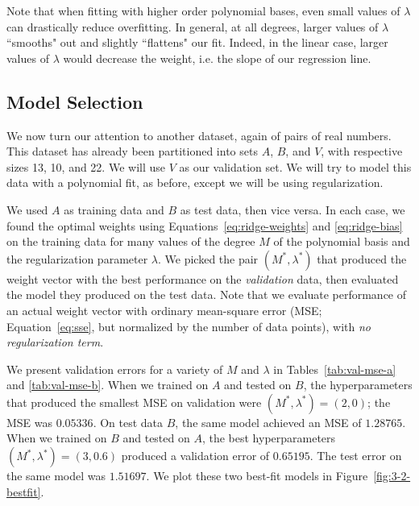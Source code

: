 \documentclass{article}
\begin{document}
\begin{multicols}{2}
Note that when fitting with higher order polynomial bases, even small values of $\lambda$ can drastically reduce overfitting. In general, at all degrees, larger values of $\lambda$ ``smooths" out and slightly ``flattens" our fit. Indeed, in the linear case, larger values of $\lambda$ would decrease the weight, i.e. the slope of our regression line.


\subsection{Model Selection}

We now turn our attention to another dataset, again of pairs of real numbers. This dataset has already been partitioned into sets $A$, $B$, and $V$, with respective sizes 13, 10, and 22. We will use $V$ as our validation set. We will try to model this data with a polynomial fit, as before, except we will be using regularization.

We used $A$ as training data and $B$ as test data, then vice versa.
In each case, we found the optimal weights using Equations~\ref{eq:ridge-weights} and \ref{eq:ridge-bias} on the training data for many values of the degree $M$ of the polynomial basis and the regularization parameter $\lambda$. We picked the pair $(M^*, \lambda^*)$ that produced the weight vector with the best performance on the \emph{validation} data, then evaluated the model they produced on the test data.
Note that we evaluate performance of an actual weight vector with ordinary mean-square error (MSE; Equation~\ref{eq:sse}, but normalized by the number of data points), with \emph{no regularization term}.

We present validation errors for a variety of $M$ and $\lambda$ in Tables~\ref{tab:val-mse-a} and \ref{tab:val-mse-b}.
When we trained on $A$ and tested on $B$, the hyperparameters that produced the smallest MSE on validation were $(M^*,\lambda^*)=(2,0)$; the MSE was $0.05336$. On test data $B$, the same model achieved an MSE of $1.28765$.
When we trained on $B$ and tested on $A$, the best hyperparameters $(M^*,\lambda^*)=(3,0.6)$ produced a validation error of $0.65195$. The test error on the same model was $1.51697$.
We plot these two best-fit models in Figure~\ref{fig:3-2-bestfit}.



\end{multicols}
\end{document}
